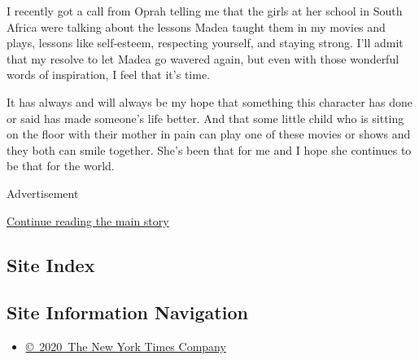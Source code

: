 I recently got a call from Oprah telling me that the girls at her school
in South Africa were talking about the lessons Madea taught them in my
movies and plays, lessons like self-esteem, respecting yourself, and
staying strong. I'll admit that my resolve to let Madea go wavered
again, but even with those wonderful words of inspiration, I feel that
it's time.

It has always and will always be my hope that something this character
has done or said has made someone's life better. And that some little
child who is sitting on the floor with their mother in pain can play one
of these movies or shows and they both can smile together. She's been
that for me and I hope she continues to be that for the world.

Advertisement

\protect\hyperlink{after-bottom}{Continue reading the main story}

\hypertarget{site-index}{%
\subsection{Site Index}\label{site-index}}

\hypertarget{site-information-navigation}{%
\subsection{Site Information
Navigation}\label{site-information-navigation}}

\begin{itemize}
\tightlist
\item
  \href{https://help.nytimes3xbfgragh.onion/hc/en-us/articles/115014792127-Copyright-notice}{©~2020~The
  New York Times Company}
\end{itemize}

